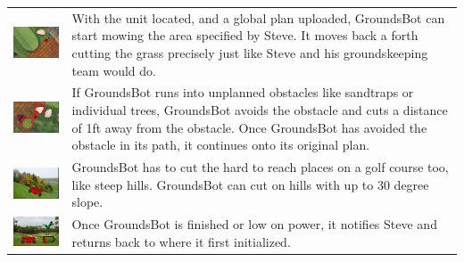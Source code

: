 \documentclass[12pt]{extarticle}
\begin{document}
\begin{table}[H]
\begin{tabularx}{\textwidth}{cX}
\includegraphics[width=6cm, valign=t]{usecase1_5.png} &
With the unit located, and a global plan uploaded, GroundsBot can start mowing the area specified by Steve.  It moves back a forth cutting the grass precisely just like Steve and his groundskeeping team would do.
\\
\includegraphics[width=6cm, valign=t]{usecase1_6.png} &
If GroundsBot runs into unplanned obstacles like sandtraps or individual trees, GroundsBot avoids the obstacle and cuts a distance of 1ft away from the obstacle.  Once GroundsBot has avoided the obstacle in its path, it continues onto its original plan.
\\
\includegraphics[width=6cm, valign=t]{usecase1_7.png} &
GroundsBot has to cut the hard to reach places on a golf course too, like steep hills.  GroundsBot can cut on hills with up to 30 degree slope.
\\
\includegraphics[width=6cm, valign=t]{usecase2_1.png} &
Once GroundsBot is finished or low on power, it notifies Steve and returns back to where it first initialized.
\\

\end{tabularx}
\end{table}
\end{document}
